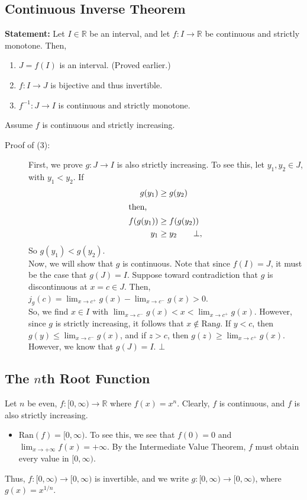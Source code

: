\documentclass[10pt]{extarticle}
\newcommand{\ran}{\text{Ran}}
\newcommand{\R}{\mathbb{R}}
\begin{document}
  \subsection{Continuous Inverse Theorem}%
    \textbf{Statement:} Let $I\in\R$ be an interval, and let $f: I\rightarrow \R$ be continuous and strictly monotone. Then,
    \begin{enumerate}[(1)]
      \item $J = f(I)$ is an interval. (Proved earlier.)
      \item $f: I\rightarrow J$ is bijective and thus invertible.
      \item $f^{-1}: J\rightarrow I$ is continuous and strictly monotone.
    \end{enumerate}

    Assume $f$ is continuous and strictly increasing.
    \begin{description}
      \item[Proof of (3):] First, we prove $g: J\rightarrow I$ is also strictly increasing. To see this, let $y_1,y_2\in J$, with $y_1 < y_2$. If
        \begin{align*}
          g(y_1) &\geq g(y_2)\\
          \shortintertext{then,}
          f(g(y_1)) &\geq f(g(y_2))\\
          y_1 &\geq y_2 \tag*{$\bot$},
        \end{align*}
        So $g(y_1) < g(y_2)$.\\

        Now, we will show that $g$ is continuous. Note that since $f(I) = J$, it must be the case that $g(J) = I$. Suppose toward contradiction that $g$ is discontinuous at $x=c\in J$. Then, $j_g(c) = \lim_{x\rightarrow c^{+}}g(x) - \lim_{x\rightarrow c^{-}}g(x)> 0$.\\

        So, we find $x\in I$ with $\lim_{x\rightarrow c^{-}}g(x)<x<\lim_{x\rightarrow c^{+}}g(x)$. However, since $g$ is strictly increasing, it follows that $x\notin \ran{g}$. If $y < c$, then $g(y) \leq \lim_{x\rightarrow c^{-}}g(x)$, and if $z > c$, then $g(z) \geq \lim_{x\rightarrow c^{+}}g(x)$. However, we know that $g(J) = I$. $\bot$
    \end{description}
  \subsection{The $n$th Root Function}%
    Let $n$ be even, $f:[0,\infty)\rightarrow \R$ where $f(x) = x^n$. Clearly, $f$ is continuous, and $f$ is also strictly increasing.
    \begin{itemize}
      \item $\ran(f) = [0,\infty)$. To see this, we see that $f(0) = 0$ and $\lim_{x\rightarrow +\infty}f(x) = +\infty$. By the Intermediate Value Theorem, $f$ must obtain every value in $[0,\infty)$.
    \end{itemize}
    Thus, $f:[0,\infty) \rightarrow [0,\infty)$ is invertible, and we write $g: [0,\infty) \rightarrow [0,\infty)$, where $g(x) = x^{1/n}$.\\
\end{document}
